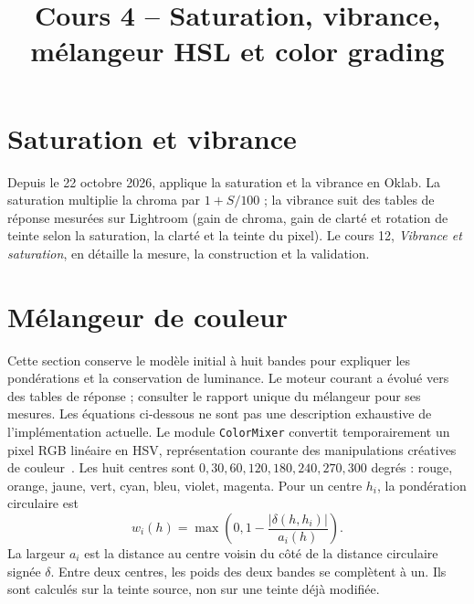 
\title{Cours 4 -- Saturation, vibrance, mélangeur HSL et color grading}


\section{Saturation et vibrance}
Depuis le 22 octobre 2026, \IPR{} applique la saturation et la vibrance en
Oklab. La saturation multiplie la chroma par $1+S/100$ ; la vibrance suit des
tables de réponse mesurées sur Lightroom (gain de chroma, gain de clarté et
rotation de teinte selon la saturation, la clarté et la teinte du pixel). Le
cours 12, \emph{Vibrance et saturation}, en détaille la mesure, la construction
et la validation.

\section{Mélangeur de couleur}
Cette section conserve le modèle initial à huit bandes pour expliquer les
pondérations et la conservation de luminance. Le moteur courant a évolué
vers des tables de réponse ; consulter le rapport unique du mélangeur pour
ses mesures. Les équations ci-dessous ne sont pas une description exhaustive
de l'implémentation actuelle.
Le module \texttt{ColorMixer} convertit temporairement un pixel RGB linéaire en HSV, représentation courante des manipulations créatives de couleur~\cite{gonzalezWoods}. Les huit centres sont $0,30,60,120,180,240,270,300$ degrés : rouge, orange, jaune, vert, cyan, bleu, violet, magenta. Pour un centre $h_i$, la pondération circulaire est
\begin{equation}
w_i(h)=\max\left(0,1-\frac{|\delta(h,h_i)|}{a_i(h)}\right).
\end{equation}
La largeur $a_i$ est la distance au centre voisin du côté de la distance circulaire signée $\delta$. Entre deux centres, les poids des deux bandes se complètent à un. Ils sont calculés sur la teinte source, non sur une teinte déjà modifiée.

